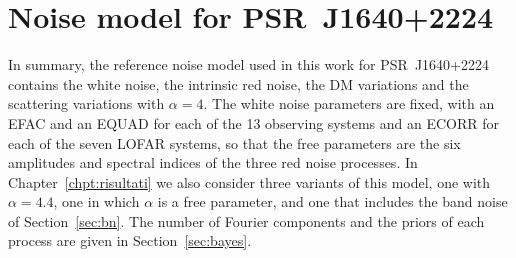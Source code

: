 \section{Noise model for PSR~J1640+2224}\label{NM}

In summary, the reference noise model used in this work for PSR~J1640+2224
contains the white noise, the intrinsic red noise, the DM variations and the
scattering variations with $\alpha = 4$. The white noise parameters are fixed,
with an EFAC and an EQUAD for each of the 13 observing systems and an ECORR for
each of the seven LOFAR systems, so that the free parameters are the six
amplitudes and spectral indices of the three red noise processes. In
Chapter~\ref{chpt:risultati} we also consider three variants of this
model, one with $\alpha = 4.4$, one in which $\alpha$ is a free parameter, and
one that includes the band noise of Section~\ref{sec:bn}. The number of
Fourier components and the priors of each process are given in
Section~\ref{sec:bayes}.